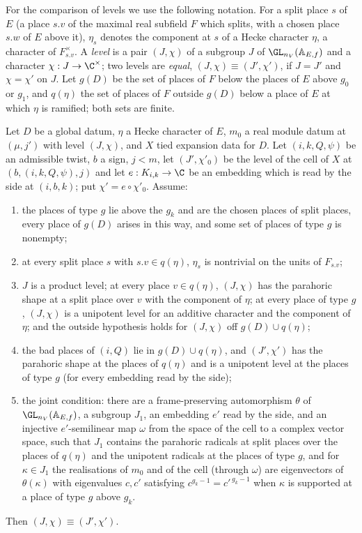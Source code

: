 For the comparison of levels we use the following notation. For a split place $s$ of $E$ (a place $s.v$ of the
maximal real subfield $F$ which splits, with a chosen place $s.w$ of $E$ above it), $\eta_s$ denotes the
component at $s$ of a Hecke character $\eta$, a character of $F_{s.v}^\times$. A \emph{level} is a pair $(J,\chi)$ of a
subgroup $J$ of $\GL_{n_V}(\mathbb A_{E,f})$ and a character $\chi:J\to\C^\times$; two levels are \emph{equal},
$(J,\chi)\equiv(J',\chi')$, if $J=J'$ and $\chi=\chi'$ on $J$. Let $g(D)$ be the set of places of $F$ below the places of
$E$ above $g_0$ or $g_1$, and $q(\eta)$ the set of places of $F$ outside $g(D)$ below a place of $E$ at which $\eta$ is
ramified; both sets are finite.

\begin{proposition}\label{pf:baselat2:leveq}
Let $D$ be a global datum, $\eta$ a Hecke character of $E$, $m_0$ a real module datum at $(\mu,j')$ with level
$(J,\chi)$, and $X$ tied expansion data for $D$. Let $(i,k,Q,\psi)$ be an admissible twist, $b$ a sign, $j<m$,
let $(J',\chi'_0)$ be the level of the cell of $X$ at $(b,(i,k,Q,\psi),j)$ and let $e:K_{i,k}\to\C$ be an embedding
which is read by the side at $(i,b,k)$; put $\chi'=e\circ\chi'_0$. Assume:
\begin{enumerate}[label=(\alph*)]
\item the places of type $g$ lie above the $g_k$ and are the chosen places of split places, every place of
  $g(D)$ arises in this way, and some set of places of type $g$ is nonempty;
\item at every split place $s$ with $s.v\in q(\eta)$, $\eta_s$ is nontrivial on the units of $F_{s.v}$;
\item $J$ is a product level; at every place $v\in q(\eta)$, $(J,\chi)$ has the parahoric shape at a split place
  over $v$ with the component of $\eta$; at every place of type $g$, $(J,\chi)$ is a unipotent level for an
  additive character and the component of $\eta$; and the outside hypothesis holds for $(J,\chi)$ off
  $g(D)\cup q(\eta)$;
\item the bad places of $(i,Q)$ lie in $g(D)\cup q(\eta)$, and $(J',\chi')$ has the parahoric shape at the places of
  $q(\eta)$ and is a unipotent level at the places of type $g$ (for every embedding read by the side);
\item the joint condition: there are a frame-preserving automorphism $\theta$ of $\GL_{n_V}(\mathbb A_{E,f})$, a
  subgroup $J_1$, an embedding $e'$ read by the side, and an injective $e'$-semilinear map $\omega$ from the space
  of the cell to a complex vector space, such that $J_1$ contains the parahoric radicals at split places over
  the places of $q(\eta)$ and the unipotent radicals at the places of type $g$, and for $\kappa\in J_1$ the realisations of
  $m_0$ and of the cell (through $\omega$) are eigenvectors of $\theta(\kappa)$ with eigenvalues $c,c'$ satisfying
  $c^{g_k-1}=c'^{\,g_k-1}$ when $\kappa$ is supported at a place of type $g$ above $g_k$.
\end{enumerate}
Then $(J,\chi)\equiv(J',\chi')$.
\end{proposition}

